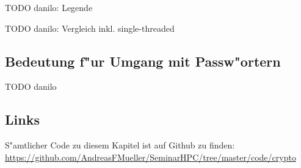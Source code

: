 \begin{refsection}
TODO danilo: Legende

TODO danilo: Vergleich inkl. single-threaded

\subsection{Bedeutung f"ur Umgang mit Passw"ortern}

TODO danilo

\subsection{Links}
\label{crypto:resultate:links}

S"amtlicher Code zu diesem Kapitel ist auf Github zu finden:\\
\url{https://github.com/AndreasFMueller/SeminarHPC/tree/master/code/crypto}


\printbibliography[heading=subbibliography]
\end{refsection}
